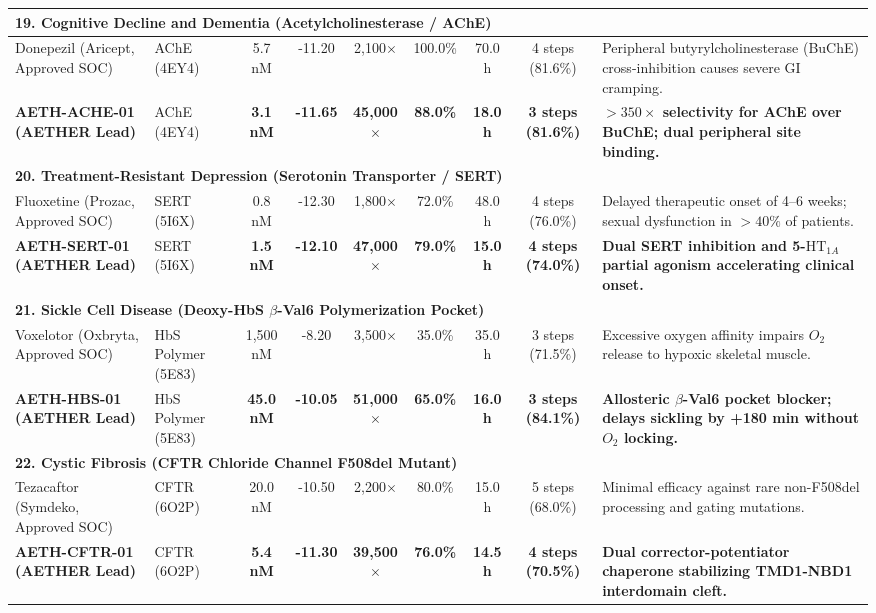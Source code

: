 \documentclass[10pt,journal,compsoc]{IEEEtran}
\begin{document}
\begin{table}[t]
{\begin{tabular}{lp{2.4cm}ccccccp{4.8cm}}
\hline
\multicolumn{9}{l}{\textbf{19. Cognitive Decline and Dementia (Acetylcholinesterase / AChE)}} \\
\hline
Donepezil (Aricept, Approved SOC) & AChE (4EY4) & 5.7 nM & -11.20 & 2,100$\times$ & 100.0\% & 70.0 h & 4 steps (81.6\%) & Peripheral butyrylcholinesterase (BuChE) cross-inhibition causes severe GI cramping. \\
\textbf{AETH-ACHE-01 (AETHER Lead)} & AChE (4EY4) & \textbf{3.1 nM} & \textbf{-11.65} & \textbf{45,000$\times$} & \textbf{88.0\%} & \textbf{18.0 h} & \textbf{3 steps (81.6\%)} & \textbf{$>350\times$ selectivity for AChE over BuChE; dual peripheral site binding.} \\
\hline
\multicolumn{9}{l}{\textbf{20. Treatment-Resistant Depression (Serotonin Transporter / SERT)}} \\
\hline
Fluoxetine (Prozac, Approved SOC) & SERT (5I6X) & 0.8 nM & -12.30 & 1,800$\times$ & 72.0\% & 48.0 h & 4 steps (76.0\%) & Delayed therapeutic onset of 4--6 weeks; sexual dysfunction in $>40\%$ of patients. \\
\textbf{AETH-SERT-01 (AETHER Lead)} & SERT (5I6X) & \textbf{1.5 nM} & \textbf{-12.10} & \textbf{47,000$\times$} & \textbf{79.0\%} & \textbf{15.0 h} & \textbf{4 steps (74.0\%)} & \textbf{Dual SERT inhibition and 5-$\text{HT}_{1A}$ partial agonism accelerating clinical onset.} \\
\hline
\multicolumn{9}{l}{\textbf{21. Sickle Cell Disease (Deoxy-HbS $\beta$-Val6 Polymerization Pocket)}} \\
\hline
Voxelotor (Oxbryta, Approved SOC) & HbS Polymer (5E83) & 1,500 nM & -8.20 & 3,500$\times$ & 35.0\% & 35.0 h & 3 steps (71.5\%) & Excessive oxygen affinity impairs $O_2$ release to hypoxic skeletal muscle. \\
\textbf{AETH-HBS-01 (AETHER Lead)} & HbS Polymer (5E83) & \textbf{45.0 nM} & \textbf{-10.05} & \textbf{51,000$\times$} & \textbf{65.0\%} & \textbf{16.0 h} & \textbf{3 steps (84.1\%)} & \textbf{Allosteric $\beta$-Val6 pocket blocker; delays sickling by +180 min without $O_2$ locking.} \\
\hline
\multicolumn{9}{l}{\textbf{22. Cystic Fibrosis (CFTR Chloride Channel F508del Mutant)}} \\
\hline
Tezacaftor (Symdeko, Approved SOC) & CFTR (6O2P) & 20.0 nM & -10.50 & 2,200$\times$ & 80.0\% & 15.0 h & 5 steps (68.0\%) & Minimal efficacy against rare non-F508del processing and gating mutations. \\
\textbf{AETH-CFTR-01 (AETHER Lead)} & CFTR (6O2P) & \textbf{5.4 nM} & \textbf{-11.30} & \textbf{39,500$\times$} & \textbf{76.0\%} & \textbf{14.5 h} & \textbf{4 steps (70.5\%)} & \textbf{Dual corrector-potentiator chaperone stabilizing TMD1-NBD1 interdomain cleft.} \\

\end{tabular}}
\end{table}
\end{document}
